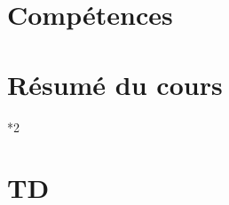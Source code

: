 \documentclass{poly}
\begin{document}
\maketitle{}

\part{Compétences}
\small 

\clearpage \part{Résumé du cours}
\begin{paracol}[1]*{2}
    \begin{leftcolumn}
    
    \end{leftcolumn}
    \begin{rightcolumn}
    \end{rightcolumn}
\end{paracol}

% 

\clearpage {} \part{TD}

\end{document}
